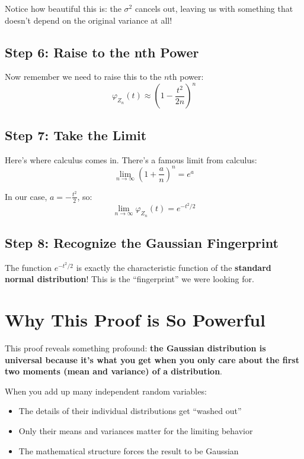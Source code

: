\documentclass[12pt]{article}
\begin{document}
Notice how beautiful this is: the $\sigma^2$ cancels out, leaving us with something that doesn't depend on the original variance at all!

\subsection*{Step 6: Raise to the nth Power}

Now remember we need to raise this to the $n$th power:
\[
\varphi_{Z_n}(t) \approx \left(1 - \frac{t^2}{2n}\right)^n
\]

\subsection*{Step 7: Take the Limit}

Here's where calculus comes in. There's a famous limit from calculus:
\[
\lim_{n \to \infty} \left(1 + \frac{a}{n}\right)^n = e^a
\]

In our case, $a = -\frac{t^2}{2}$, so:
\[
\lim_{n \to \infty} \varphi_{Z_n}(t) = e^{-t^2/2}
\]

\subsection*{Step 8: Recognize the Gaussian Fingerprint}

The function $e^{-t^2/2}$ is exactly the characteristic function of the \textbf{standard normal distribution}! This is the ``fingerprint'' we were looking for.

\section*{Why This Proof is So Powerful}

This proof reveals something profound: \textbf{the Gaussian distribution is universal because it's what you get when you only care about the first two moments (mean and variance) of a distribution}.

When you add up many independent random variables:
\begin{itemize}
\item The details of their individual distributions get ``washed out''

    \item Only their means and variances matter for the limiting behavior
    \item The mathematical structure forces the result to be Gaussian
\end{itemize}
\end{document}
